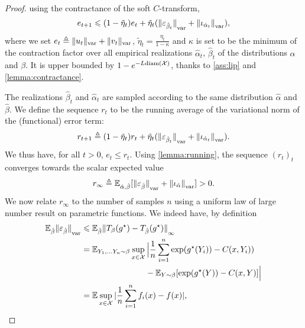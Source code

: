 \begin{proof}
using the contractance of the soft $C$-transform,
\begin{equation}
    \label{eq:ineq_var}
    e_{t+1} \leqslant 
    (1 - \tilde \eta_t) e_t
    + \tilde \eta_t
    ({\Vert \varepsilon_{\hat \beta_t} \Vert}_{\text{\upshape var}} + 
    {\Vert \iota_{\hat \alpha_t} \Vert}_{\text{\upshape var}}),
\end{equation}
where we set $e_t \triangleq \Vert u_t \Vert_{\text{\upshape var}} + \Vert v_t \Vert_{\text{\upshape var}}$,
$\tilde \eta_t = \frac{\eta_t}{1-\kappa}$ and $\kappa$ is set to be the minimum
of the contraction factor over all empirical realizations $\hat \alpha_t$, $\hat
\beta_t$ of the distributions $\alpha$ and $\beta$. It is upper bounded by
$1 - e^{- L\text{diam}(\mathcal{X})}$, thanks to \autoref{ass:lip} and \autoref{lemma:contractance}.

The realizations $\hat \beta_t$ and $\hat \alpha_t$
are sampled according to the same distribution $\hat \alpha$ and $\hat \beta$. We
define the sequence $r_t$ to be the running average of the variational norm of the
(functional) error term:
\begin{equation}
    r_{t+1} \triangleq (1 - \tilde \eta_t) r_t + \tilde \eta_t 
    ({\Vert \varepsilon_{\hat \beta_t} \Vert}_{\text{\upshape var}} + 
    {\Vert \iota_{\hat \alpha_t} \Vert}_{\text{\upshape var}}).
\end{equation}
We thus have, for all $t > 0$, $e_t \leq r_t$. Using \autoref{lemma:running}, the sequence $(r_t)_t$
converges towards the scalar expected value
\begin{equation}\label{eq:r_infty}
    r_\infty \triangleq \mathbb{E}_{\hat \alpha, \hat \beta}[{\Vert \varepsilon_{\hat \beta} \Vert}_{\text{\upshape var}}
    + {\Vert \iota_{\hat \alpha} \Vert}_{\text{\upshape var}}] > 0.
\end{equation}
We now relate $r_\infty$ to the number of samples $n$ using
a uniform law of large number result on parametric functions. We indeed have, by definition
\begin{align}
    \mathbb{E}_{\hat \beta} {\Vert \varepsilon_{\hat \beta} \Vert}_{\text{\upshape var}} 
    &\leqslant
    \mathbb{E}_{\hat \beta} {\Vert T_{\beta}(g^\star) 
    - T_{\hat \beta}(g^\star) \Vert}_{\infty} \\
    &= \mathbb{E}_{Y_1, \dots Y_n \sim \beta} 
    \sup_{x \in \mathcal{X}}
     \Big| \frac{1}{n} \sum_{i=1}^n \exp(g^\star(Y_i)) - C(x, Y_i)) \\
      &\phantom{=}\qquad\qquad\qquad\quad- \mathbb{E}_{Y \sim \beta}[\exp(g^\star(Y)) - C(x, Y)] \Big| \\
      &= \mathbb{E} \sup_{x \in \mathcal{X}} | \frac{1}{n} \sum_{i=1}^n f_i(x) - f(x) | ,
\end{align}

\end{proof}
